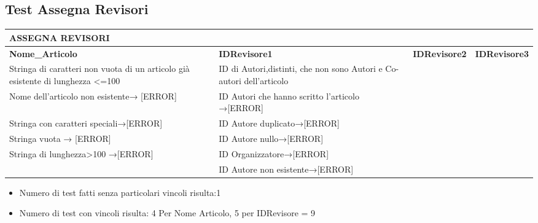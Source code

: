 \subsection{Test Assegna Revisori}
\label{sec:test_assegna_revisori}

\begin{tabular}{|p{3.5cm}|p{2cm}|p{2cm}|p{2cm}}
\hline
\rowcolor{SkyBlue}
\textbf{ASSEGNA REVISORI}&&&\\
\hline
\rowcolor{Red}
\textbf{Nome_Articolo} & \textbf{IDRevisore1} & \textbf{IDRevisore2} & \textbf{IDRevisore3}\\

Stringa di caratteri non vuota di un articolo già esistente di lunghezza <=100 & ID di Autori,distinti, che non sono Autori e Co-autori dell'articolo&&\\

Nome dell'articolo non esistente→ [ERROR]& ID Autori che hanno scritto l'articolo →[ERROR]&&\\

Stringa con caratteri speciali→[ERROR]&  ID Autore duplicato→[ERROR]&&\\

Stringa vuota → [ERROR]&ID Autore nullo→[ERROR]&&\\

Stringa di lunghezza>100 →[ERROR]& ID Organizzatore→[ERROR]&&\\

& ID Autore non esistente→[ERROR] &&\\
\hline 
\end{tabular}

\begin{itemize}
\item Numero di test fatti senza particolari vincoli risulta:1
\item Numero di test con vincoli risulta: 4 Per Nome Articolo, 5 per IDRevisore = 9 
\end{itemize}

